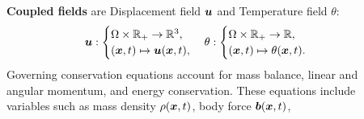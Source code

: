 \documentclass[25pt, a0paper,
portrait,
margin=2mm, 
innermargin=2mm, 
blockverticalspace=7mm, %
colspace=2mm, %
subcolspace=0mm]{tikzposter}
\makeatletter
\newcommand*{\inputfig}[3][htb]{{
    \def\fps@figure{#1}
    \def\DIR{#2}
    \def\LABEL{#3}
    \graphicspath{{\DIR/}}
    
}}
\makeatother
\begin{document}
\begin{columns}
	{
		\begin{minipage}{0.35\textwidth}
			\begin{mdframed}
				\begin{center}
					\inputfig{floats/structuralfivefields_multi_edited}{structuralfivefields_multi_edited}
				\end{center}
				\vspace{-14mm}
			\end{mdframed}
			\begin{mdframed}
				\textbf{Coupled fields} are  
				Displacement field ${\boldsymbol{\mathnormal u}}$ and Temperature field $\theta$:
				\begin{align*}
					{\boldsymbol{\mathnormal u}}:
					\begin{cases}
						\Omega \times \mathbb{R}_{+} \rightarrow \mathbb{R}^3, \\
						({\boldsymbol{\mathnormal x}},t) \mapsto {\boldsymbol{\mathnormal u}}({\boldsymbol{\mathnormal x}},t),
					\end{cases}
					\theta:
					\begin{cases}
						\Omega \times \mathbb{R}_{+} \rightarrow \mathbb{R}, \\
						({\boldsymbol{\mathnormal x}},t) \mapsto \theta({\boldsymbol{\mathnormal x}},t).
					\end{cases}
				\end{align*}
				Governing conservation equations
				account for mass balance, 
				linear and angular momentum,
				and energy conservation.
				These equations include variables such as
				mass density $\rho({\boldsymbol{\mathnormal x}},t)$, 
				body force ${\boldsymbol{\mathnormal b}}({\boldsymbol{\mathnormal x}},t)$,

\end{mdframed}
\end{minipage}}
\end{columns}
\end{document}
